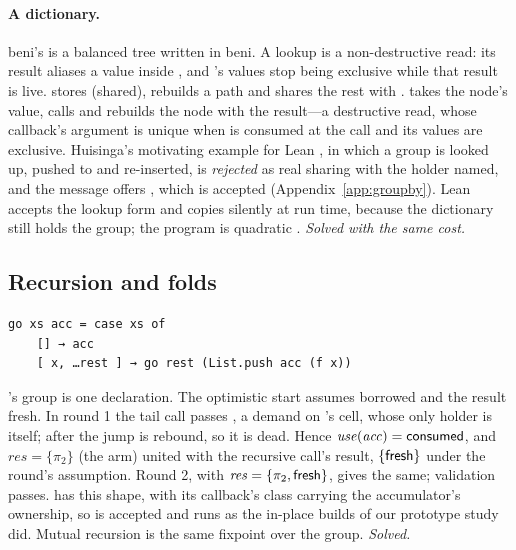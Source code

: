 \paragraph{A dictionary.} beni's  is a balanced tree written in beni. A lookup
 is a non-destructive read: its result aliases a value inside , and 's
values stop being exclusive while that result is live.  stores  (shared),
rebuilds a path and shares the rest with .  takes the node's value,
calls  and rebuilds the node with the result---a destructive read, whose callback's argument is
unique when  is consumed at the call and its values are exclusive. Huisinga's motivating
example for Lean \citep[\S2.1]{huisinga2023lean}, in which a group is looked up, pushed to and
re-inserted, is \emph{rejected} as real sharing with the holder named, and the message offers
, which is accepted (Appendix~\ref{app:groupby}). Lean accepts the lookup form and
copies silently at run time, because the dictionary still holds the group; the program is
quadratic \citep[\S2.4]{huisinga2023lean}. \emph{Solved with the same cost.}

\subsection{Recursion and folds}
\label{sec:hard-recursion}

\begin{Verbatim}
go xs acc = case xs of
    [] → acc
    [ x, …rest ] → go rest (List.push acc (f x))
\end{Verbatim}
's group is one declaration. The optimistic start assumes  borrowed and the result
fresh. In round 1 the tail call passes , a demand on 's cell, whose only
holder is  itself; after the jump  is rebound, so it is dead. Hence
$\mathit{use}(\mathit{acc}) = \mathsf{consumed}$, and $\mathit{res} = \{\pi_2\}$ (the \code{[]} arm) united with
the recursive call's result, $\{\mathsf{fresh}\}$ under the round's assumption. Round 2, with
$\mathit{res} = \{\pi_2, \mathsf{fresh}\}$, gives the same; validation passes.  has this shape,
with its callback's class carrying the accumulator's ownership, so
 is accepted and runs as the in-place builds of our
prototype study did. Mutual recursion is the same fixpoint over the group. \emph{Solved.}

